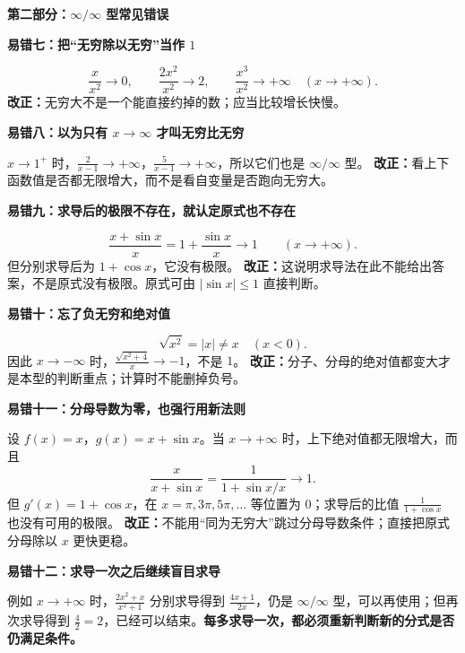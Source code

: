 \clearpage
\begin{trapbox}
\textbf{\textcolor{CTrap}{第二部分：$\infty/\infty$ 型常见错误}}

\textbf{\textcolor{CTrap}{易错七：把“无穷除以无穷”当作 $1$}}

\[
\frac{x}{x^2}\to0,\qquad \frac{2x^2}{x^2}\to2,\qquad\frac{x^3}{x^2}\to+\infty
\quad(x\to+\infty).
\]
\textbf{改正：}无穷大不是一个能直接约掉的数；应当比较增长快慢。

\medskip
\textbf{\textcolor{CTrap}{易错八：以为只有 $x\to\infty$ 才叫无穷比无穷}}

$x\to1^+$ 时，$\frac2{x-1}\to+\infty$，$\frac5{x-1}\to+\infty$，所以它们也是 $\infty/\infty$ 型。
\textbf{改正：}看上下函数值是否都无限增大，而不是看自变量是否跑向无穷大。

\medskip
\begin{minipage}{\linewidth}
\textbf{\textcolor{CTrap}{易错九：求导后的极限不存在，就认定原式也不存在}}
\begin{center}\end{center}
\end{minipage}



\[
\frac{x+\sin x}{x}=1+\frac{\sin x}{x}\longrightarrow1
\qquad(x\to+\infty).
\]
但分别求导后为 $1+\cos x$，它没有极限。
\textbf{改正：}这说明求导法在此不能给出答案，不是原式没有极限。原式可由 $|\sin x|\le1$ 直接判断。

\medskip

\medskip
\textbf{\textcolor{CTrap}{易错十：忘了负无穷和绝对值}}

\[
\sqrt{x^2}=|x|\ne x\quad(x<0).
\]
因此 $x\to-\infty$ 时，$\frac{\sqrt{x^2+4}}{x}\to-1$，不是 $1$。
\textbf{改正：}分子、分母的绝对值都变大才是本型的判断重点；计算时不能删掉负号。

\medskip
\textbf{\textcolor{CTrap}{易错十一：分母导数为零，也强行用新法则}}

设 $f(x)=x$，$g(x)=x+\sin x$。当 $x\to+\infty$ 时，上下绝对值都无限增大，而且
\[
\frac{x}{x+\sin x}=\frac1{1+\sin x/x}\longrightarrow1.
\]
但 $g'(x)=1+\cos x$，在 $x=\pi,3\pi,5\pi,\ldots$ 等位置为 $0$；求导后的比值 $\frac1{1+\cos x}$ 也没有可用的极限。
\textbf{改正：}不能用“同为无穷大”跳过分母导数条件；直接把原式分母除以 $x$ 更快更稳。

\medskip
\textbf{\textcolor{CTrap}{易错十二：求导一次之后继续盲目求导}}

例如 $x\to+\infty$ 时，$\frac{2x^2+x}{x^2+1}$ 分别求导得到 $\frac{4x+1}{2x}$，仍是 $\infty/\infty$ 型，可以再使用；但再次求导得到 $\frac42=2$，已经可以结束。\textbf{每多求导一次，都必须重新判断新的分式是否仍满足条件。}

\end{trapbox}
